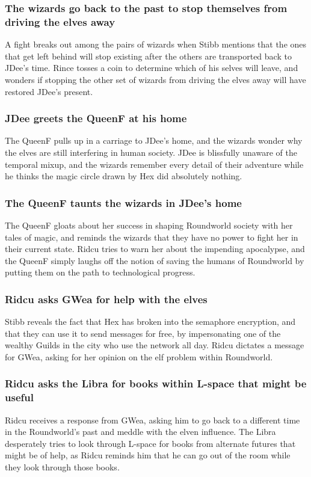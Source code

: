 \subsubsection{The wizards go back to the past to stop themselves from driving the elves away}
A fight breaks out among the pairs of wizards when \Gls{Stibb} mentions that the ones that get
left behind will stop existing after the others are transported back to \Gls{JDee}'s time.
\Gls{Rince} tosses a coin to determine which of his selves will leave, and wonders if stopping the
other set of wizards from driving the elves away will have restored \Gls{JDee}'s present.

\subsubsection{\Gls{JDee} greets the \Gls{QueenF} at his home}
The \Gls{QueenF} pulls up in a carriage to \Gls{JDee}'s home, and the wizards wonder why the elves
are still interfering in human society. \Gls{JDee} is blissfully unaware of the temporal mixup,
and the wizards remember every detail of their adventure while he thinks the magic circle drawn
by \Gls{Hex} did absolutely nothing.

\subsubsection{The \Gls{QueenF} taunts the wizards in \Gls{JDee}'s home}
The \Gls{QueenF} gloats about her success in shaping Roundworld society with her tales of magic,
and reminds the wizards that they have no power to fight her in their current state. \Gls{Ridcu}
tries to warn her about the impending apocalypse, and the \Gls{QueenF} simply laughs off the notion
of saving the humans of Roundworld by putting them on the path to technological progress.

\subsubsection{\Gls{Ridcu} asks \Gls{GWea} for help with the elves}
\Gls{Stibb} reveals the fact that \Gls{Hex} has broken into the semaphore encryption, and that they
can use it to send messages for free, by impersonating one of the wealthy Guilds in the city who
use the network all day. \Gls{Ridcu} dictates a message for \Gls{GWea}, asking for her opinion on
the elf problem within Roundworld.

\subsubsection{\Gls{Ridcu} asks the \Gls{Libra} for books within L-space that might be useful}
\Gls{Ridcu} receives a response from \Gls{GWea}, asking him to go back to a different time in the
Roundworld's past and meddle with the elven influence. The \Gls{Libra} desperately tries to look
through L-space for books from alternate futures that might be of help, as \Gls{Ridcu} reminds him
that he can go out of the room while they look through those books.

